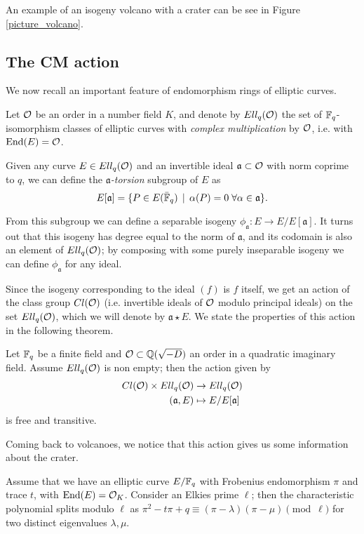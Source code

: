 An example of an isogeny volcano with a crater can be see in Figure \ref{picture_volcano}.

\subsection{The CM action}
We now recall an important feature of endomorphism rings of elliptic curves.

Let $\mathcal{O}$ be an order in a number field $K$, and denote by $Ell_q(\mathcal{O})$ the set of $\mathbb{F}_q$-isomorphism classes of elliptic curves with \emph{complex multiplication} by $\mathcal{O}$, i.e. with $\operatorname{End}(E)=\mathcal{O}$.

Given any curve $E\in Ell_q(\mathcal{O})$ and an invertible ideal $\mathfrak{a}\subset\mathcal{O}$ with norm coprime to $q$, we can define the \emph{$\mathfrak{a}$-torsion} subgroup of $E$ as $$E[\mathfrak{a}]=\{ P\in E(\bar{\mathbb{F}}_q) \operatorname{\; |\;} \alpha(P)=0\;\forall\alpha\in\mathfrak{a} \}.$$

From this subgroup we can define a separable isogeny $\phi_{\mathfrak{a}}: E\to E/E[\mathfrak{a}]$. It turns out that this isogeny has degree equal to the norm of $\mathfrak{a}$, and its codomain is also an element of $Ell_q(\mathcal{O})$; by composing with some purely inseparable isogeny we can define $\phi_{\mathfrak{a}}$ for any ideal.

Since the isogeny corresponding to the ideal $(f)$ is $f$ itself, we get an action of the class group $Cl(\mathcal{O})$ (i.e. invertible ideals of $\mathcal{O}$ modulo principal ideals) on the set $Ell_q(\mathcal{O})$, which we will denote by $\mathfrak{a}\star E$. We state the properties of this action in the following theorem.

\begin{theorem}
    Let $\mathbb{F}_q$ be a finite field and $\mathcal{O}\subset\mathbb{Q}(\sqrt{-D})$ an order in a quadratic imaginary field. Assume $Ell_q(\mathcal{O})$ is non empty; then the action given by
    \begin{align*}
    Cl(\mathcal{O})\times Ell_q(\mathcal{O}) & \to  Ell_q(\mathcal{O})\\
    (\mathfrak{a}, E) & \mapsto  E/E[\mathfrak{a}]
    \end{align*}
    is free and transitive.
\end{theorem}

Coming back to volcanoes, we notice that this action gives us some information about the crater.

Assume that we have an elliptic curve $E/\mathbb{F}_q$ with Frobenius endomorphism $\pi$ and trace $t$, with $\operatorname{End}(E)=\mathcal{O}_K$. Consider an Elkies prime $\ell$; then the characteristic polynomial splits modulo $\ell$ as $\pi^2-t\pi+q\equiv(\pi-\lambda)(\pi-\mu)\pmod\ell$ for two distinct eigenvalues $\lambda,\mu$.

